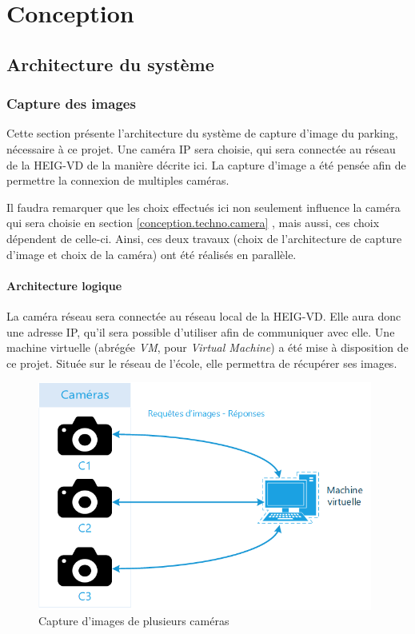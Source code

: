 \chapter{Conception}


\section{Architecture du système}\label{conception.architecture}

\subsection{Capture des images}
Cette section présente l'architecture du système de capture d'image du parking, nécessaire à ce projet. Une caméra IP sera choisie, qui sera connectée au réseau de la HEIG-VD de la manière décrite ici. La capture d'image a été pensée afin de permettre la connexion de multiples caméras.

Il faudra remarquer que les choix effectués ici non seulement influence la caméra qui sera choisie en section \ref{conception.techno.camera} , mais aussi, ces choix dépendent de celle-ci. Ainsi, ces deux travaux (choix de l'architecture de capture d'image et choix de la caméra) ont été réalisés en parallèle.

\subsubsection{Architecture logique}\label{conception.architecture.capture.logique}

La caméra réseau sera connectée au réseau local de la HEIG-VD. Elle aura donc une adresse IP, qu'il sera possible d'utiliser afin de communiquer avec elle. Une machine virtuelle (abrégée \textit{VM}, pour \textit{Virtual Machine}) a été mise à disposition de ce projet. Située sur le réseau de l'école, elle permettra de récupérer ses images.

\begin{figure}[!ht]
    \includegraphics[width=110mm]{img/conception/logic_arch.png}
    \centering
    \caption{Capture d'images de plusieurs caméras}
    \label{fig:capture_cameras}
\end{figure}

